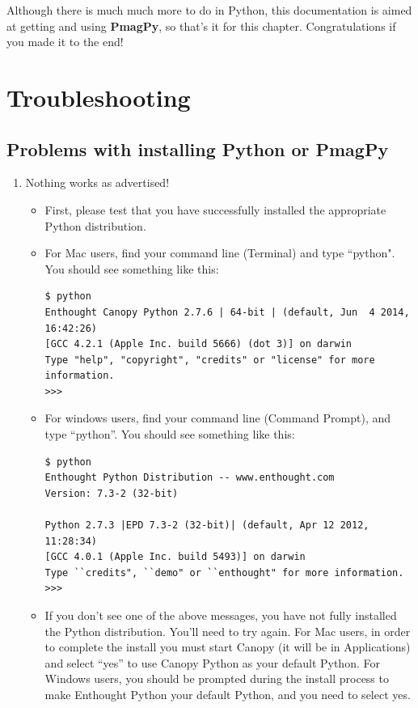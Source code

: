 \documentclass[11pt]{book}
\begin{document}
{{{{Although there is much much more to do in Python, this documentation is aimed at getting and using {\bf PmagPy}, so that's it for this chapter. Congratulations if you made it to the end!


\chapter{Troubleshooting}
\label{chap:trouble}

\section{Problems with installing Python or PmagPy}

\begin{enumerate}

 \item Nothing works as advertised!


  \begin{itemize}

 \item First, please test that you have successfully installed the appropriate Python distribution.

 \item For Mac users, find your command line (Terminal) and type ``python".  You should see something like this:


\begin{verbatim}$ python
Enthought Canopy Python 2.7.6 | 64-bit | (default, Jun  4 2014, 16:42:26)
[GCC 4.2.1 (Apple Inc. build 5666) (dot 3)] on darwin
Type "help", "copyright", "credits" or "license" for more information.
>>>
\end{verbatim}



\item For windows users, find your command line (Command Prompt), and type ``python''.  You should see something like this:

\begin{verbatim}$ python
Enthought Python Distribution -- www.enthought.com
Version: 7.3-2 (32-bit)

Python 2.7.3 |EPD 7.3-2 (32-bit)| (default, Apr 12 2012, 11:28:34)
[GCC 4.0.1 (Apple Inc. build 5493)] on darwin
Type ``credits", ``demo" or ``enthought" for more information.
>>>
\end{verbatim}

\item If you don't see one of the above messages, you have not fully installed the Python distribution.  You'll need to try again.  For Mac users, in order to complete the install you must start Canopy (it will be in Applications) and select ``yes'' to use Canopy Python as your default Python.  For Windows users, you should be prompted during the install process to make Enthought Python your default Python, and you need to select yes.


\end{itemize}
\end{enumerate}}}}}
\end{document}
